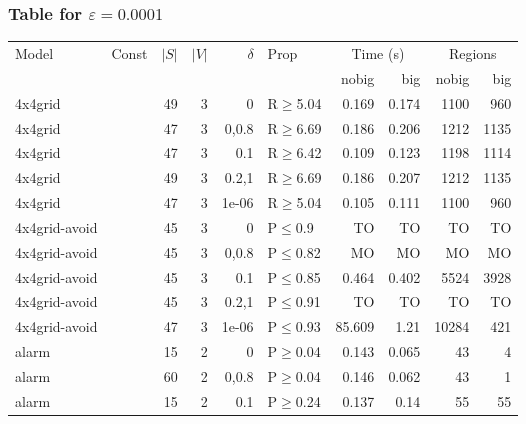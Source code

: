\subsubsection{Table for \(\varepsilon=0.0001\)}
\begin{longtable}{llrrrlrrrr}

        \toprule
        Model & Const & $|S|$ & $|V|$ & $\delta$ & Prop & \multicolumn{2}{c}{Time (s)} & \multicolumn{2}{c}{Regions} \\
        \cmidrule(ll){7-8} \cmidrule(ll){9-10}
        & & & & & & nobig & big & nobig & big \\
        \midrule
        
 4x4grid       &          &     	49 &   3 & 0     & R$\geq$5.04  & 0.169    & 0.174    & 1100    & 960     \\
 4x4grid       &          &     	47 &   3 & 0,0.8 & R$\geq$6.69  & 0.186    & 0.206    & 1212    & 1135    \\
 4x4grid       &          &     	47 &   3 & 0.1   & R$\geq$6.42  & 0.109    & 0.123    & 1198    & 1114    \\
 4x4grid       &          &     	49 &   3 & 0.2,1 & R$\geq$6.69  & 0.186    & 0.207    & 1212    & 1135    \\
 4x4grid       &          &     	47 &   3 & 1e-06 & R$\geq$5.04  & 0.105    & 0.111    & 1100    & 960     \\
 4x4grid-avoid &          &     	45 &   3 & 0     & P$\leq$0.9   & TO       & TO       & TO      & TO      \\
 4x4grid-avoid &          &     	45 &   3 & 0,0.8 & P$\leq$0.82  & MO       & MO       & MO      & MO      \\
 4x4grid-avoid &          &     	45 &   3 & 0.1   & P$\leq$0.85  & 0.464    & 0.402    & 5524    & 3928    \\
 4x4grid-avoid &          &     	45 &   3 & 0.2,1 & P$\leq$0.91  & TO       & TO       & TO      & TO      \\
 4x4grid-avoid &          &     	47 &   3 & 1e-06 & P$\leq$0.93  & 85.609   & 1.21     & 10284   & 421     \\
 alarm         &          &     	15 &   2 & 0     & P$\geq$0.04  & 0.143    & 0.065    & 43      & 4       \\
 alarm         &          &     	60 &   2 & 0,0.8 & P$\geq$0.04  & 0.146    & 0.062    & 43      & 1       \\
 alarm         &          &     	15 &   2 & 0.1   & P$\geq$0.24  & 0.137    & 0.14     & 55      & 55      \\

\end{longtable}
